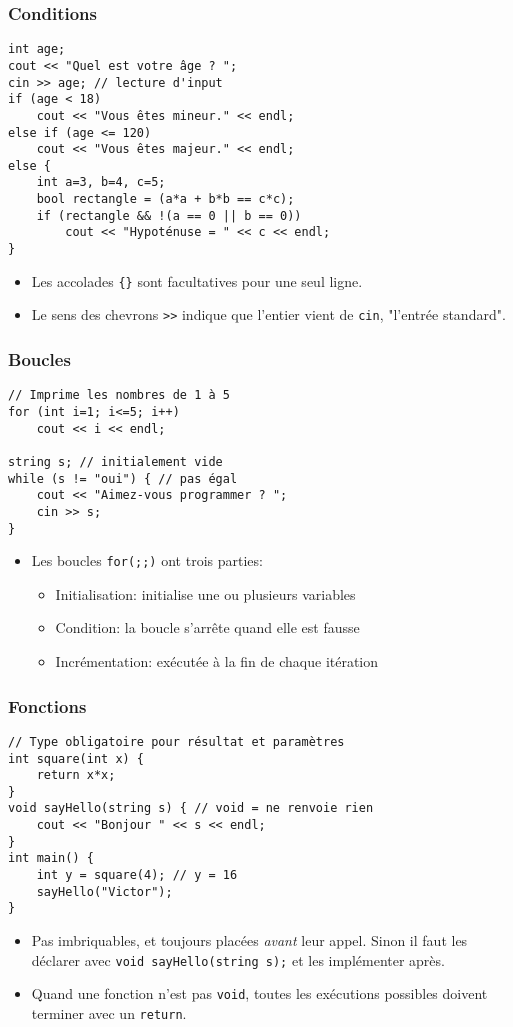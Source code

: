 \documentclass[12pt]{beamer}
\begin{document}
\begin{frame}[fragile]
\frametitle{Conditions}
\begin{lstlisting}
int age;
cout << "Quel est votre âge ? ";
cin >> age; // lecture d'input
if (age < 18)
    cout << "Vous êtes mineur." << endl;
else if (age <= 120)
    cout << "Vous êtes majeur." << endl;
else {
    int a=3, b=4, c=5;
    bool rectangle = (a*a + b*b == c*c);
    if (rectangle && !(a == 0 || b == 0))
        cout << "Hypoténuse = " << c << endl;
}
\end{lstlisting}
\begin{itemize}
\item Les accolades \lstinline|{}| sont facultatives pour une seul ligne.
\item Le sens des chevrons \lstinline|>>| indique que l'entier vient de \lstinline|cin|, "l'entrée standard".
\end{itemize}
\end{frame}

\begin{frame}[fragile]
\frametitle{Boucles}
\begin{lstlisting}
// Imprime les nombres de 1 à 5
for (int i=1; i<=5; i++)
    cout << i << endl;

string s; // initialement vide
while (s != "oui") { // pas égal
    cout << "Aimez-vous programmer ? ";
    cin >> s;
}
\end{lstlisting}
\begin{itemize}
\item Les boucles \lstinline|for(;;)| ont trois parties:
\begin{itemize}
\item Initialisation: initialise une ou plusieurs variables
\item Condition: la boucle s'arrête quand elle est fausse
\item Incrémentation: exécutée à la fin de chaque itération
\end{itemize}
\end{itemize}
\end{frame}

\begin{frame}[fragile]
\frametitle{Fonctions}
\begin{lstlisting}
// Type obligatoire pour résultat et paramètres
int square(int x) {
    return x*x;
}
void sayHello(string s) { // void = ne renvoie rien
    cout << "Bonjour " << s << endl;
}
int main() {
    int y = square(4); // y = 16
    sayHello("Victor");
}
\end{lstlisting}
\begin{itemize}
\item Pas imbriquables, et toujours placées \emph{avant} leur appel. Sinon il faut les déclarer avec \lstinline|void sayHello(string s);| et les implémenter après.
\item Quand une fonction n'est pas \lstinline|void|, toutes les exécutions possibles doivent terminer avec un \lstinline|return|.
\end{itemize}
\end{frame}
\end{document}
